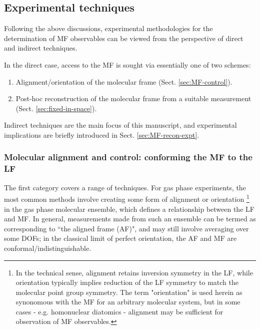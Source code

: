 \subsection{Experimental techniques\label{sec:experimentalTechniques}}

Following the above discussions, experimental methodologies for the determination of MF observables can be viewed from the perspective of direct and indirect techniques. 

In the direct case, access to the MF is sought via essentially one of two schemes:

\begin{enumerate}
\item Alignment/orientation of the molecular frame (Sect. \ref{sec:MF-control}).
\item Post-hoc reconstruction of the molecular frame from a suitable measurement (Sect. \ref{sec:fixed-in-space}).
\end{enumerate}

Indirect techniques are the main focus of this manuscript, and experimental implications are briefly introduced in Sect. \ref{sec:MF-recon-expt}.




\subsubsection{Molecular alignment and control: conforming the MF to the LF\label{sec:MF-control}}

The first category covers a range of techniques. For gas phase experiments, the most common methods involve creating some form of alignment or orientation \footnote{In the technical sense, alignment retains 
inversion symmetry in the LF, while orientation typically implies reduction of the LF symmetry to match the molecular point group symmetry. The term "orientation" is used herein as synonomous with the MF for an arbitrary molecular system, but in some cases - e.g. homonuclear diatomics - alignment may be sufficient for observation of MF observables.} 
in the gas phase molecular ensemble, which defines a relationship between the LF and MF. In general, measurements made from such an ensemble can be termed as corresponding to ``the aligned frame (AF)", and may still involve averaging over some DOFs; in the 
classical limit of perfect orientation, the AF and MF are conformal/indistinguishable. 

